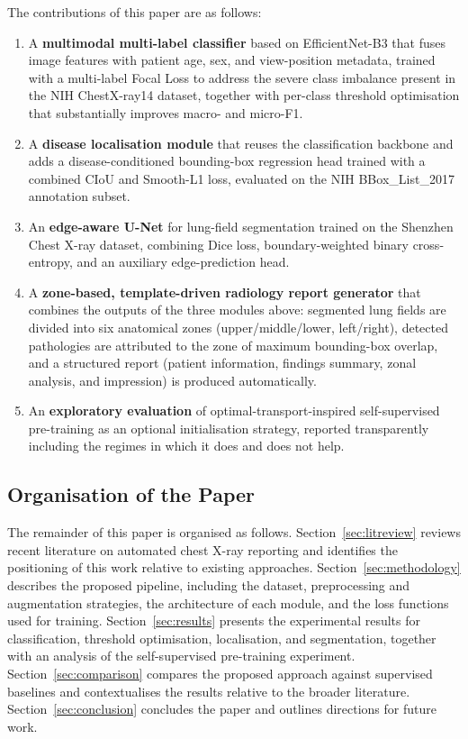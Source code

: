 \documentclass[preprint,12pt,authoryear]{elsarticle}
\begin{document}
The contributions of this paper are as follows:
\begin{enumerate}
    \item A \textbf{multimodal multi-label classifier} based on EfficientNet-B3 that fuses image features with patient age, sex, and view-position metadata, trained with a multi-label Focal Loss to address the severe class imbalance present in the NIH ChestX-ray14 dataset, together with per-class threshold optimisation that substantially improves macro- and micro-F1.
    \item A \textbf{disease localisation module} that reuses the classification backbone and adds a disease-conditioned bounding-box regression head trained with a combined CIoU and Smooth-L1 loss, evaluated on the NIH BBox\_List\_2017 annotation subset.
    \item An \textbf{edge-aware U-Net} for lung-field segmentation trained on the Shenzhen Chest X-ray dataset, combining Dice loss, boundary-weighted binary cross-entropy, and an auxiliary edge-prediction head.
    \item A \textbf{zone-based, template-driven radiology report generator} that combines the outputs of the three modules above: segmented lung fields are divided into six anatomical zones (upper/middle/lower, left/right), detected pathologies are attributed to the zone of maximum bounding-box overlap, and a structured report (patient information, findings summary, zonal analysis, and impression) is produced automatically.
    \item An \textbf{exploratory evaluation} of optimal-transport-inspired self-supervised pre-training as an optional initialisation strategy, reported transparently including the regimes in which it does and does not help.
\end{enumerate}

\subsection{Organisation of the Paper}
\label{sec:organisation}

The remainder of this paper is organised as follows. Section~\ref{sec:litreview} reviews recent literature on automated chest X-ray reporting and identifies the positioning of this work relative to existing approaches. Section~\ref{sec:methodology} describes the proposed pipeline, including the dataset, preprocessing and augmentation strategies, the architecture of each module, and the loss functions used for training. Section~\ref{sec:results} presents the experimental results for classification, threshold optimisation, localisation, and segmentation, together with an analysis of the self-supervised pre-training experiment. Section~\ref{sec:comparison} compares the proposed approach against supervised baselines and contextualises the results relative to the broader literature. Section~\ref{sec:conclusion} concludes the paper and outlines directions for future work.
\end{document}
